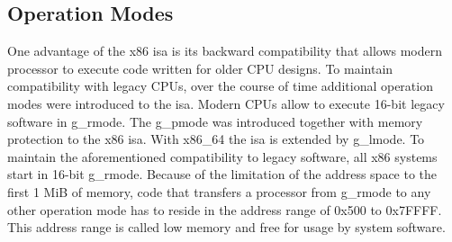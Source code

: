 \subsection{Operation Modes}
\label{sec:state:technical:modes}
One advantage of the x86 \gls{isa} is its backward compatibility that allows
modern processor to execute code written for older CPU designs. To maintain
compatibility with legacy CPUs, over the course of time additional operation
modes were introduced to the \gls{isa}. Modern CPUs allow to execute 16-bit
legacy software in \gls{g_rmode}. The \gls{g_pmode} was introduced together with
memory protection to the x86 \gls{isa}. With x86\_64 the \gls{isa} is extended
by \gls{g_lmode}\cite{intel_sdm}. To maintain the aforementioned compatibility
to legacy software, all x86 systems start in 16-bit \gls{g_rmode}. Because of
the limitation of the address space to the first 1 MiB of memory, code that
transfers a processor from \gls{g_rmode} to any other operation mode has to
reside in the address range of 0x500 to 0x7FFFF. This address range is called
low memory and free for usage by system software.


